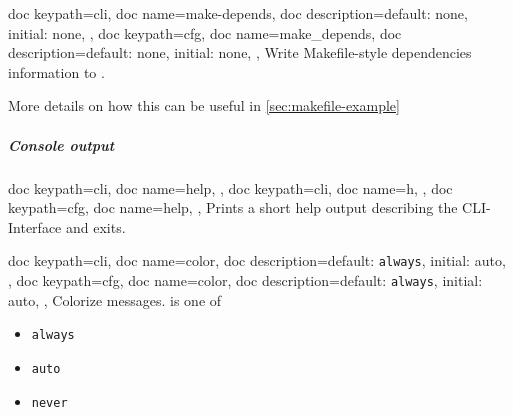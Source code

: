 \documentclass[a4paper, 11pt]{scrartcl}
\begin{document}
\begin{docKeys}[
		doc parameter={=\meta{make\_depends}},
	]{
		{
			doc keypath=cli,
			doc name=make-depends,
			doc description={default: none, initial: none},
		},
		{
			doc keypath=cfg,
			doc name=make_depends,
			doc description={default: none, initial: none},
		},
	}
	Write Makefile-style dependencies information to .

	More details on how this can be useful in \cref{sec:makefile-example}
\end{docKeys}

\subparagraph{Console output}
\begin{docKeys}[
	]{
		{
			doc keypath=cli,
			doc name=help,
		},
		{
			doc keypath=cli,
			doc name=h,
		},
		{
			doc keypath=cfg,
			doc name=help,
		},
	}
	Prints a short help output describing the CLI-Interface and exits.
\end{docKeys}
\begin{docKeys}[
		doc parameter={=\meta{color}},
	]{
		{
			doc keypath=cli,
			doc name=color,
			doc description={default: \texttt{always}, initial: auto},
		},
		{
			doc keypath=cfg,
			doc name=color,
			doc description={default: \texttt{always}, initial: auto},
		},
	}
	Colorize messages.
	 is one of
	\begin{multicols}{3}
		\begin{itemize}
			\item \texttt{always}
			\item \texttt{auto}
			\item \texttt{never}
		\end{itemize}
	\end{multicols}
\end{docKeys}
\end{document}
